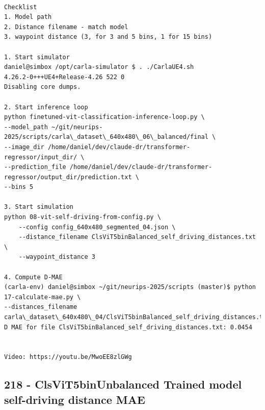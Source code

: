\begin{verbatim}

Checklist
1. Model path
2. Distance filename - match model
3. waypoint distance (3, for 3 and 5 bins, 1 for 15 bins)

1. Start simulator
daniel@simbox /opt/carla-simulator $ . ./CarlaUE4.sh 
4.26.2-0+++UE4+Release-4.26 522 0
Disabling core dumps.

2. Start inference loop
python finetuned-vit-classification-inference-loop.py \
--model_path ~/git/neurips-2025/scripts/carla\_dataset\_640x480\_06\_balanced/final \
--image_dir /home/daniel/dev/claude-dr/transformer-regressor/input_dir/ \
--prediction_file /home/daniel/dev/claude-dr/transformer-regressor/output_dir/prediction.txt \
--bins 5

3. Start simulation
python 08-vit-self-driving-from-config.py \
    --config config_640x480_segmented_04.json \
    --distance_filename ClsViT5binBalanced_self_driving_distances.txt \
    --waypoint_distance 3

4. Compute D-MAE
(carla-env) daniel@simbox ~/git/neurips-2025/scripts (master)$ python 17-calculate-mae.py \
--distances_filename carla\_dataset\_640x480\_04/ClsViT5binBalanced_self_driving_distances.txt
D MAE for file ClsViT5binBalanced_self_driving_distances.txt: 0.0454


Video: https://youtu.be/MwoEE8zlGWg

\end{verbatim}

\subsection{218 - ClsViT5binUnbalanced Trained model self-driving distance MAE}
\label{app_res:218}

